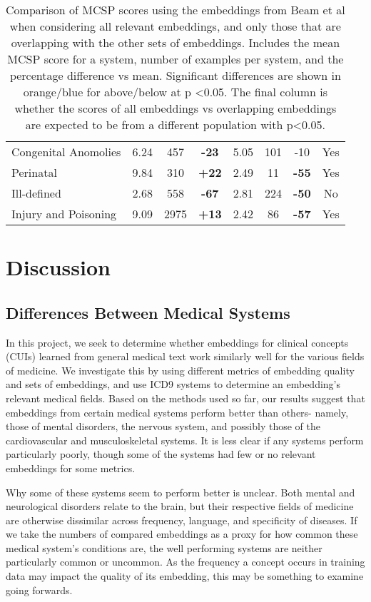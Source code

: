\documentclass[10pt]{article}
\def\blu#1{{\textbf{\color{blu}#1}}}
\def\ora#1{{\textbf{\color{ora}#1}}}
\begin{document}
\begin{table*}[h]
\begin{tabular}{l|c|c|c|c|c|c|c}
		Congenital Anomolies & 6.24  & 457      & \blu{-23}       & 5.05 & 101      & -10             & Yes        \\
		Perinatal            & 9.84  & 310      & \ora{+22}        & 2.49 & 11       & \blu{-55}       & Yes        \\
		Ill-defined          & 2.68  & 558      & \blu{-67}       & 2.81 & 224      & \blu{-50}       & No         \\
		Injury and Poisoning & 9.09  & 2975     & \ora{+13}        & 2.42 & 86       & \blu{-57}       & Yes             
	\end{tabular}
\caption{Comparison of MCSP scores using the embeddings from Beam et al when considering all relevant embeddings, and only those that are overlapping with the other sets of embeddings. Includes the mean MCSP score for a system, number of examples per system, and the percentage difference vs mean. Significant differences are shown in orange/blue for above/below at p \textless 0.05. The final column is whether the scores of all embeddings vs overlapping embeddings are expected to be from a different population with p\textless 0.05.}
\end{table*}

\section{Discussion}

\subsection{Differences Between Medical Systems}
In this project, we seek to determine whether embeddings for clinical concepts (CUIs) learned from general medical text work similarly well for the various fields of medicine. We investigate this by using different metrics of embedding quality and sets of embeddings, and use ICD9 systems to determine an embedding's relevant medical fields. Based on the methods used so far, our results suggest that embeddings from certain medical systems perform better than others- namely, those of mental disorders, the nervous system, and possibly those of the cardiovascular and musculoskeletal systems. It is less clear if any systems perform particularly poorly, though some of the systems had few or no relevant embeddings for some metrics. 

Why some of these systems seem to perform better is unclear. Both mental and neurological disorders relate to the brain, but their respective fields of medicine are otherwise dissimilar across frequency, language, and specificity of diseases.  If we take the numbers of compared embeddings as a proxy for how common these medical system's conditions are, the well performing systems are neither particularly common or uncommon. As the frequency a concept occurs in training data may impact the quality of its embedding, this may be something to examine going forwards. 
\end{document}
